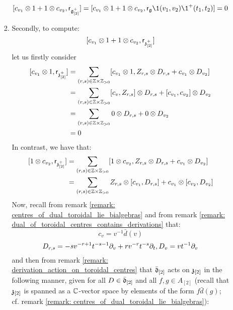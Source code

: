 \begin{remark}
\begin{enumerate}
\begin{enumerate}
\begin{enumerate}
                                $$[c_{v_1} \tensor 1 + 1 \tensor c_{v_2}, \sfr_{\g_{[2]}^+}] = [c_{v_1} \tensor 1 + 1 \tensor c_{v_2}, \sfr_{\g} \1(v_1, v_2) \1^+(t_1, t_2)] = 0$$
                            \item Secondly, to compute:
                                $$[c_{v_1} \tensor 1 + 1 \tensor c_{v_2}, \sfr_{\z_{[2]}^+}]$$
                            let us firstly consider 
                                $$
                                    \begin{aligned}
                                         [c_{v_1} \tensor 1, \sfr_{\z_{[2]}^+}] & = \sum_{(r, s) \in \Z \x \Z_{> 0}} [c_{v_1} \tensor 1, Z_{r, s} \tensor D_{r, s} + c_{v_1} \tensor D_{v_2}]
                                         \\
                                         & = \sum_{(r, s) \in \Z \x \Z_{> 0}} [c_v, Z_{r, s}] \tensor D_{r, s} + [c_{v_1}, c_{v_2}] \tensor D_{v_2}
                                         \\
                                         & = \sum_{(r, s) \in \Z \x \Z_{> 0}} 0 \tensor D_{r, s} + 0 \tensor D_{v_2}
                                         \\
                                         & = 0
                                    \end{aligned}
                                $$
                            In contrast, we have that:
                                $$
                                    \begin{aligned}
                                         [1 \tensor c_{v_2}, \sfr_{\z_{[2]}^+}] & = \sum_{(r, s) \in \Z \x \Z_{> 0}} [1 \tensor c_{v_2}, Z_{r, s} \tensor D_{r, s} + c_{v_1} \tensor D_{v_2}]
                                         \\
                                         & = \sum_{(r, s) \in \Z \x \Z_{> 0}} Z_{r, s} \tensor [c_{v_1}, D_{r, s}] + c_{v_1} \tensor [c_{v_2}, D_{v_2}]
                                    \end{aligned}
                                $$
                            Now, recall from remark \ref{remark: centres_of_dual_toroidal_lie_bialgebras} and from remark \ref{remark: dual_of_toroidal_centres_contains_derivations} that:
                                $$c_v = v^{-1} \bar{d}(v)$$
                                $$D_{r, s} = -s v^{-r + 1} t^{-s - 1} \partial_v + r v^{-r} t^{-s} \partial_t, D_v = vt^{-1} \partial_v$$
                            and then from remark \ref{remark: derivation_action_on_toroidal_centres} that $\bar{\mathfrak{d}}_{[2]}$ acts on $\mathfrak{z}_{[2]}$ in the following manner, given for all $D \in \bar{\mathfrak{d}}_{[2]}$ and all $f, g \in A_{[2]}$ (recall that $\mathfrak{z}_{[2]}$ is spanned as a $\mathbb{C}$-vector space by elements of the form $f \bar{d}(g)$; cf. remark \ref{remark: centres_of_dual_toroidal_lie_bialgebras}):

\end{enumerate}
\end{enumerate}
\end{enumerate}
\end{remark}
